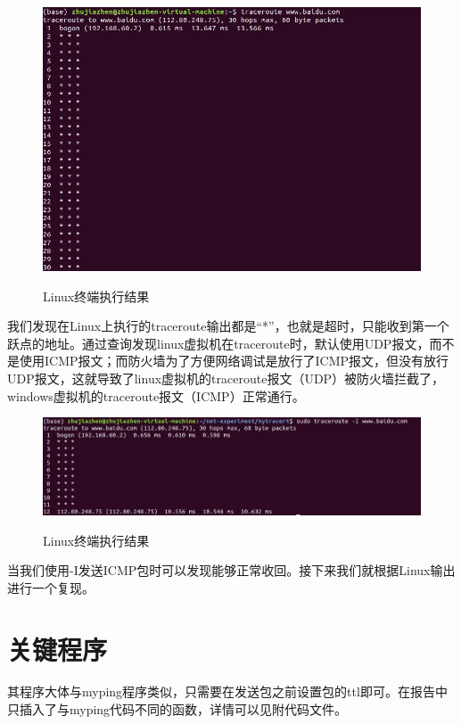 \documentclass[12pt]{ctexart}
\begin{document}
    \begin{figure}[H]
        \centering
        \includegraphics[width=5in]{figures/linux.jpg}
        \label{li}
        \caption{Linux终端执行结果}
    \end{figure}

    我们发现在Linux上执行的traceroute输出都是“*”，也就是超时，只能收到第一个跃点的地址。通过查询发现linux虚拟机在traceroute时，默认使用UDP报文，而不是使用ICMP报文；而防火墙为了方便网络调试是放行了ICMP报文，但没有放行UDP报文，这就导致了linux虚拟机的traceroute报文（UDP）被防火墙拦截了，windows虚拟机的traceroute报文（ICMP）正常通行。

    \begin{figure}[H]
        \centering
        \includegraphics[width=5in]{figures/linux-true.jpg}
        \label{li2}
        \caption{Linux终端执行结果}
    \end{figure}

    当我们使用-I发送ICMP包时可以发现能够正常收回。接下来我们就根据Linux输出进行一个复现。

    \section{关键程序}
    其程序大体与myping程序类似，只需要在发送包之前设置包的ttl即可。在报告中只插入了与myping代码不同的函数，详情可以见附代码文件。
\end{document}
